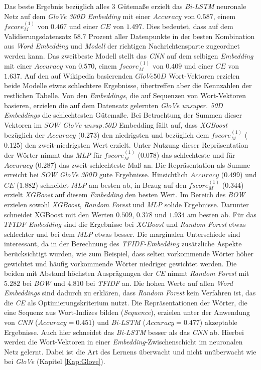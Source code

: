 \documentclass[a4paper,11pt]{article}
\begin{document}
Das beste Ergebnis bezüglich alles $3$ Gütemaße erzielt das \textit{Bi-LSTM} neuronale Netz auf dem \textit{GloVe 300D Embedding} mit einer $Accuracy$ von $0.587$, einem $fscore_M^{(1)}$ von $0.467$ und einer $CE$ von $1.497$. Dies bedeutet, dass auf dem Validierungsdatensatz $58.7$ Prozent aller Datenpunkte in der besten Kombination aus \textit{Word Embedding} und \textit{Modell} der richtigen Nachrichtensparte zugeordnet werden kann. Das zweitbeste Modell stellt das \textit{CNN} auf dem selbigen \textit{Embedding} mit einer $Accuracy$ von $0.570$, einem $fscore_M^{(1)}$ von $0.409$ und einer $CE$ von $1.637$. Auf den auf Wikipedia basierenden $GloVe 50D$ Wort-Vektoren erzielen beide Modelle etwas schlechtere Ergebnisse, übertreffen aber die Kennzahlen der restlichen Tabelle. Von den \textit{Embeddings}, die auf Sequenzen von Wort-Vektoren basieren, erzielen die auf dem Datensatz gelernten \textit{GloVe unsuper. 50D} \textit{Embeddings} die schlechtesten Gütemaße. Bei Betrachtung der Summen dieser Vektoren im \textit{SOW GloVe unsup.50D} Embedding fällt auf, dass \textit{XGBoost} bezüglich der $Accuracy$ ($0.273$) den niedrigsten und bezüglich dem $fscore_M^{(1)}$ ($0.125$) den zweit-niedrigsten Wert erzielt. Unter Nutzung dieser Repräsentation der Wörter nimmt das \textit{MLP} für $fscore_M^{(1)}$ ($0.078$) das schlechteste und für $Accuracy$ ($0.287$) das zweit-schlechteste Maß an. Die Repräsentation als Summe erreicht bei \textit{SOW GloVe 300D} gute Ergebnisse. Hinsichtlich $Accuracy$ ($0.499$) und $CE$ ($1.882$) schneidet \textit{MLP} am besten ab, in Bezug auf den $fscore_M^{(1)}$ ($0.344$) erzielt \textit{XGBoost} auf diesem \textit{Embedding} den besten Wert. Im Bereich des \textit{BOW} erzielen sowohl \textit{XGBoost}, \textit{Random Forest} und \textit{MLP} solide Ergebnisse. Darunter schneidet XGBoost mit den Werten $0.509$, $0.378$ und $1.934$ am besten ab. Für das $TFIDF$ \textit{Embedding} sind die Ergebnisse bei \textit{XGBoost} und \textit{Random Forest} etwas schlechter und bei dem \textit{MLP} etwas besser. Die marginalen Unterschiede sind interessant, da in der Berechnung des \textit{TFIDF-Embedding} zusätzliche Aspekte berücksichtigt wurden, wie zum Beispiel, dass selten vorkommende Wörter höher gewichtet und häufig vorkommende Wörter niedriger gewichtet werden. Die beiden mit Abstand höchsten Ausprägungen der \textit{CE} nimmt \textit{Random Forest} mit $5.282$ bei \textit{BOW} und $4.810$ bei \textit{TFIDF} an. Die hohen Werte auf allen \textit{Word Embeddings} sind dadurch zu erklären, dass \textit{Random Forest} kein Verfahren ist, das die \textit{CE} als Optimierungskriterium nutzt. Die Repräsentationen der Wörter, die eine Sequenz aus Wort-Indizes bilden (\textit{Sequence}), erzielen unter der Anwendung von \textit{CNN} ($Accuracy = 0.451$) und \textit{Bi-LSTM} ($Accuracy = 0.477$) akzeptable Ergebnisse. Auch hier schneidet das \textit{Bi-LSTM} besser als das \textit{CNN} ab. Hierbei werden die Wort-Vektoren in einer \textit{Embedding}-Zwischenschicht im neuronalen Netz gelernt. Dabei ist die Art des Lernens überwacht und nicht unüberwacht wie bei \textit{GloVe} (Kapitel \ref{Kap:Glove}).
\end{document}
